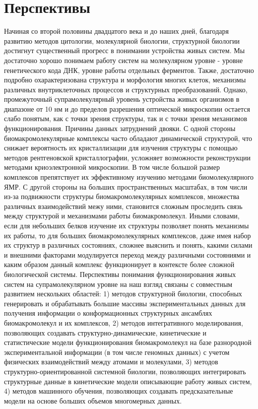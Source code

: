 \section*{Перспективы}
Начиная со второй половины двадцатого века и до наших дней, благодаря развитию методов цитологии, молекулярной биологии, структурной биологии достигнут существенный прогресс в понимании устройства живых систем. Мы достаточно хорошо понимаем работу систем на молекулярном уровне - уровне генетического кода ДНК, уровне работы отдельных ферментов. Также, достаточно подробно охарактеризована структура и морфология многих клеток, механизмы различных внутриклеточных процессов и структурных преобразований. Однако, промежуточный супрамолекулярный уровень устройства живых организмов в диапазоне от 10 нм и до пределов разрешения оптической микроскопии остается слабо понятым, как с точки зрения структуры, так и с точки зрения механизмов функционирования.
Причины данных затруднений двояки. С одной стороны биомакромолекулярные комплексы часто обладают динамической структурой, что снижает вероятность их кристаллизации для изучения структуры с помощью методов рентгеновской кристаллографии, усложняет возможности реконструкции методами криоэлектронной микроскопии. В том числе большой размер комплексов препятствует их эффективному изучению методами биомолекулярного ЯМР. С другой стороны на больших пространственных масштабах, в том числи из-за подвижности структуры биомакромолекулярных комплексов, множества различных взаимодействий межу ними, становится сложным проследить связь между структурой и механизмами работы биомакромолекул. Иными словами, если для небольших белков изучение их структуры позволяет понять механизмы их работы, то для больших биомакромолекулярных комплексов, даже имея набор их структур в различных состояниях, сложнее выяснить и понять, какими силами и внешними факторами модулируется переход между различными состояниями и каким образом данный комплекс функционирует в контексте более сложной биологической системы.
Перспективы понимания функционирования живых систем на супрамолекулярном уровне на наш взгляд связаны с совместным развитием нескольких областей: 1) методов структурной биологии, способных генерировать и обрабатывать большие массивы экспериментальных данных для получения информации о конформационных структурных ансамблях биомакромолекул и их комплексов, 2) методов интегративного моделирования, позволяющих создавать структурно-динамические, кинетические и статистические модели функционирования биомакромолекул на базе разнородной экспериментальной информации (в том числе геномных данных) с учетом физических взаимодействий между атомами и молекулами, 3) методов структурно-ориентированной системной биологии, позволяющих  интегрировать структурные данные в кинетические модели описывающие работу живых систем, 4) методов машинного обучения, позволяющих создавать предсказательные модели на основе больших объемов многомерных данных.

